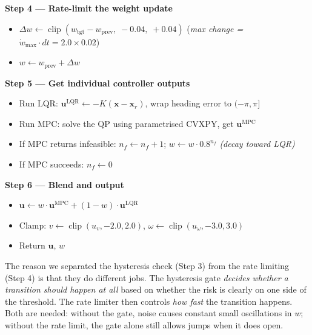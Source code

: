 \documentclass[12pt,a4paper]{article}
\begin{document}
\begin{mdframed}[backgroundcolor=gray!6, linecolor=gray!40, linewidth=1pt,
  innertopmargin=10pt, innerbottommargin=10pt,
  innerleftmargin=12pt, innerrightmargin=8pt]
\textbf{Step 4 — Rate-limit the weight update}
\begin{itemize}[leftmargin=1.5cm, itemsep=1pt]
  \item $\Delta w \leftarrow \operatorname{clip}(w_{\text{tgt}} - w_{\text{prev}},\;
    -0.04,\; +0.04)$ \quad (\textit{max change = $\dot{w}_{\max} \cdot dt = 2.0 \times 0.02$})
  \item $w \leftarrow w_{\text{prev}} + \Delta w$
\end{itemize}

\textbf{Step 5 — Get individual controller outputs}
\begin{itemize}[leftmargin=1.5cm, itemsep=1pt]
  \item Run LQR: $\mathbf{u}^{\text{LQR}} \leftarrow -K(\mathbf{x} - \mathbf{x}_r)$,
    wrap heading error to $(-\pi, \pi]$
  \item Run MPC: solve the QP using parametrised CVXPY, get $\mathbf{u}^{\text{MPC}}$
  \item If MPC returns infeasible: $n_f \leftarrow n_f + 1$;\;
    $w \leftarrow w \cdot 0.8^{n_f}$ \quad \textit{(decay toward LQR)}
  \item If MPC succeeds: $n_f \leftarrow 0$
\end{itemize}

\textbf{Step 6 — Blend and output}
\begin{itemize}[leftmargin=1.5cm, itemsep=1pt]
  \item $\mathbf{u} \leftarrow w \cdot \mathbf{u}^{\text{MPC}}
    + (1 - w) \cdot \mathbf{u}^{\text{LQR}}$
  \item Clamp: $v \leftarrow \operatorname{clip}(u_v, -2.0, 2.0)$,\;
    $\omega \leftarrow \operatorname{clip}(u_\omega, -3.0, 3.0)$
  \item Return $\mathbf{u}$, $w$
\end{itemize}

\end{mdframed}

\medskip

The reason we separated the hysteresis check (Step 3) from the rate
limiting (Step 4) is that they do different jobs. The hysteresis gate
\emph{decides whether a transition should happen at all} based on whether
the risk is clearly on one side of the threshold. The rate limiter then
controls \emph{how fast} the transition happens. Both are needed: without
the gate, noise causes constant small oscillations in $w$; without the
rate limit, the gate alone still allows jumps when it does open.
\end{document}
